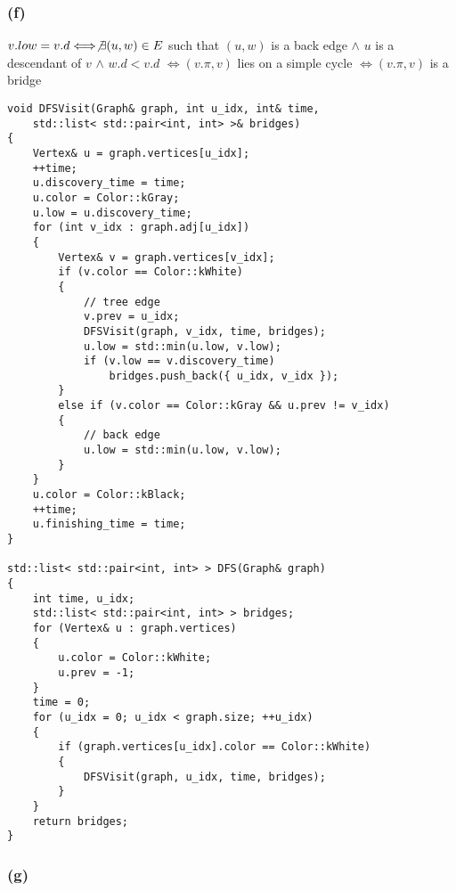 \subsubsection*{(f)}

$v.low = v.d \Longleftrightarrow
\not\exists (u,w) \in E$ such that $(u,w)$ is a back edge $\wedge$
$u$ is a descendant of $v$ $\wedge$ $w.d < v.d$
$\Longleftrightarrow (v.\pi,v)$ lies on a simple cycle
$\Longleftrightarrow (v.\pi,v)$ is a bridge

\begin{verbatim}
void DFSVisit(Graph& graph, int u_idx, int& time, 
    std::list< std::pair<int, int> >& bridges)
{
    Vertex& u = graph.vertices[u_idx];
    ++time;
    u.discovery_time = time;
    u.color = Color::kGray;
    u.low = u.discovery_time;
    for (int v_idx : graph.adj[u_idx])
    {
        Vertex& v = graph.vertices[v_idx];
        if (v.color == Color::kWhite)
        {
            // tree edge
            v.prev = u_idx;
            DFSVisit(graph, v_idx, time, bridges);
            u.low = std::min(u.low, v.low);
            if (v.low == v.discovery_time)
                bridges.push_back({ u_idx, v_idx });
        }
        else if (v.color == Color::kGray && u.prev != v_idx)
        {
            // back edge
            u.low = std::min(u.low, v.low);
        }
    }
    u.color = Color::kBlack;
    ++time;
    u.finishing_time = time;
}

std::list< std::pair<int, int> > DFS(Graph& graph)
{
    int time, u_idx;
    std::list< std::pair<int, int> > bridges;
    for (Vertex& u : graph.vertices)
    {
        u.color = Color::kWhite;
        u.prev = -1;
    }
    time = 0;
    for (u_idx = 0; u_idx < graph.size; ++u_idx)
    {
        if (graph.vertices[u_idx].color == Color::kWhite)
        {
            DFSVisit(graph, u_idx, time, bridges);
        }
    }
    return bridges;
}
\end{verbatim}

\subsubsection*{(g)}

